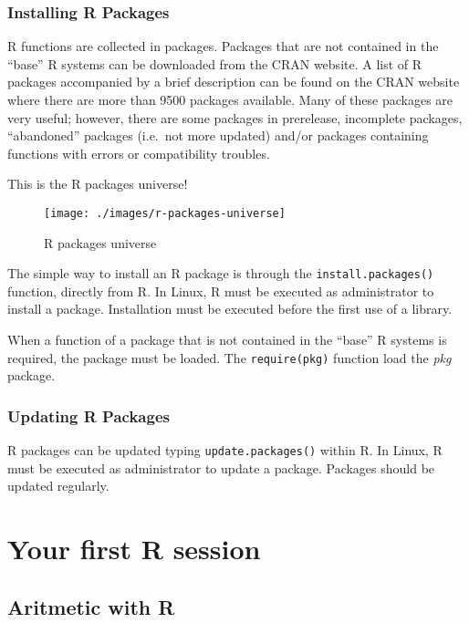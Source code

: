 \documentclass[]{book}
\begin{document}
\subsection{Installing R Packages}\label{installing-r-packages}

R functions are collected in packages. Packages that are not contained
in the ``base'' R systems can be downloaded from the CRAN website. A
list of R packages accompanied by a brief description can be found on
the CRAN website where there are more than 9500 packages available. Many
of these packages are very useful; however, there are some packages in
prerelease, incomplete packages, ``abandoned'' packages (i.e.~not more
updated) and/or packages containing functions with errors or
compatibility troubles.

This is the R packages universe!

\begin{figure}

{\centering \texttt{[image: ./images/r-packages-universe]} 

}

\caption{R packages universe}\label{fig:g5}
\end{figure}

The simple way to install an R package is through the
\texttt{install.packages()} function, directly from R. In Linux, R must
be executed as administrator to install a package. Installation must be
executed before the first use of a library.

When a function of a package that is not contained in the ``base'' R
systems is required, the package must be loaded. The
\texttt{require(pkg)} function load the \emph{pkg} package.

\subsection{Updating R Packages}\label{updating-r-packages}

R packages can be updated typing \texttt{update.packages()} within R. In
Linux, R must be executed as administrator to update a package. Packages
should be updated regularly.

\chapter{Your first R session}\label{your-first-r-session}

\section{Aritmetic with R}\label{aritmetic-with-r}
\end{document}
